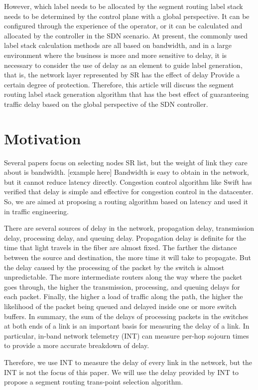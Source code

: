 \documentclass[conference]{IEEEtran}
\begin{document}
However, which label needs to be allocated by the segment routing label stack needs to be determined by the control plane with a global perspective. It can be configured through the experience of the operator, or it can be calculated and allocated by the controller in the SDN scenario. At present, the commonly used label stack calculation methods are all based on bandwidth, and in a large environment where the business is more and more sensitive to delay, it is necessary to consider the use of delay as an element to guide label generation, that is, the network layer represented by SR has the effect of delay Provide a certain degree of protection. Therefore, this article will discuss the segment routing label stack generation algorithm that has the best effect of guaranteeing traffic delay based on the global perspective of the SDN controller.


\section{Motivation}
Several papers focus on selecting nodes SR list, but the weight of link they care about is bandwidth. [example here] Bandwidth is easy to obtain in the network, but it cannot reduce latency directly. Congestion control algorithm like Swift has verified that delay is simple and effective for congestion control in the datacenter. So, we are aimed at proposing a routing algorithm based on latency and used it in traffic engineering.

There are several sources of delay in the network, propagation delay, transmission delay, processing delay, and queuing delay. Propagation delay is definite for the time that light travels in the fiber are almost fixed. The farther the distance between the source and destination, the more time it will take to propagate. But the delay caused by the processing of the packet by the switch is almost unpredictable. The more intermediate routers along the way where the packet goes through, the higher the transmission, processing, and queuing delays for each packet. Finally, the higher a load of traffic along the path, the higher the likelihood of the packet being queued and delayed inside one or more switch buffers. In summary, the sum of the delays of processing packets in the switches at both ends of a link is an important basis for measuring the delay of a link. In particular, in-band network telemetry (INT) can measure per-hop sojourn times to provide a more accurate breakdown of delay.

Therefore, we use INT to measure the delay of every link in the network, but the INT is not the focus of this paper. We will use the delay provided by INT to propose a segment routing trans-point selection algorithm.
\end{document}
